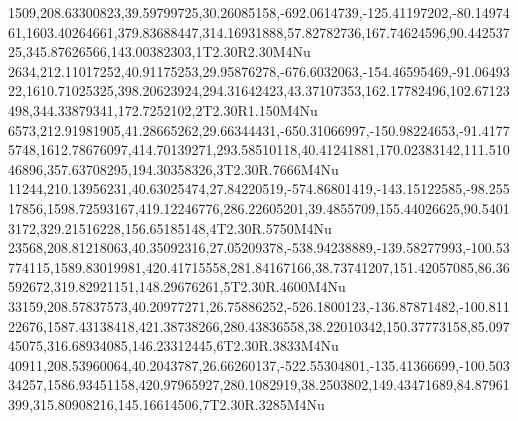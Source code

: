 1509,208.63300823,39.59799725,30.26085158,-692.0614739,-125.41197202,-80.1497461,1603.40264661,379.83688447,314.16931888,57.82782736,167.74624596,90.44253725,345.87626566,143.00382303,1T2.30R2.30M4Nu
2634,212.11017252,40.91175253,29.95876278,-676.6032063,-154.46595469,-91.0649322,1610.71025325,398.20623924,294.31642423,43.37107353,162.17782496,102.67123498,344.33879341,172.7252102,2T2.30R1.150M4Nu
6573,212.91981905,41.28665262,29.66344431,-650.31066997,-150.98224653,-91.41775748,1612.78676097,414.70139271,293.58510118,40.41241881,170.02383142,111.51046896,357.63708295,194.30358326,3T2.30R.7666M4Nu
11244,210.13956231,40.63025474,27.84220519,-574.86801419,-143.15122585,-98.25517856,1598.72593167,419.12246776,286.22605201,39.4855709,155.44026625,90.54013172,329.21516228,156.65185148,4T2.30R.5750M4Nu
23568,208.81218063,40.35092316,27.05209378,-538.94238889,-139.58277993,-100.53774115,1589.83019981,420.41715558,281.84167166,38.73741207,151.42057085,86.36592672,319.82921151,148.29676261,5T2.30R.4600M4Nu
33159,208.57837573,40.20977271,26.75886252,-526.1800123,-136.87871482,-100.81122676,1587.43138418,421.38738266,280.43836558,38.22010342,150.37773158,85.09745075,316.68934085,146.23312445,6T2.30R.3833M4Nu
40911,208.53960064,40.2043787,26.66260137,-522.55304801,-135.41366699,-100.50334257,1586.93451158,420.97965927,280.1082919,38.2503802,149.43471689,84.87961399,315.80908216,145.16614506,7T2.30R.3285M4Nu

